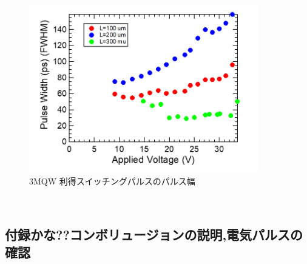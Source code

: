 {\begin{figure}[h]
	\centering
	\includegraphics[width=10cm]{figure/fig_3_2_3QW_ridge_GS_FWHM.png}
		\caption{3MQW 利得スイッチングパルスのパルス幅}
		\label{fig:fig_3_2_3QW_ridge_GS_FWHM}
\end{figure}
\clearpage　
\subsection{付録かな??コンボリュージョンの説明,電気パルスの確認}%
}
